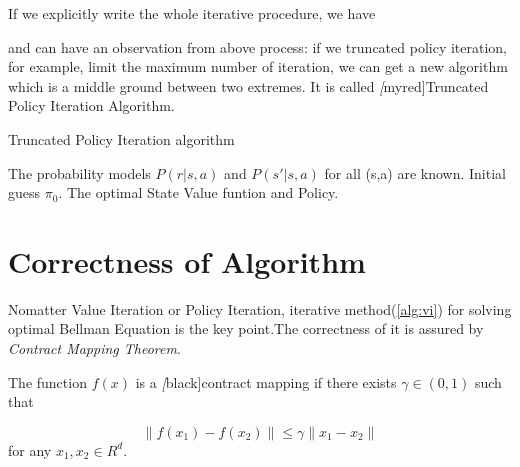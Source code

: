 If we explicitly write the whole iterative procedure, we have \par
\begin{minipage}{\textwidth}
	\centering
\end{minipage}
and can have an observation from above process:
if we truncated policy iteration, for example, limit the maximum number of iteration, we can get a new algorithm which is a middle ground between two extremes. It is called \emph[myred]{Truncated Policy Iteration Algorithm}.\par
\begin{algorithm}[H]
	\caption{Truncated Policy Iteration algorithm}
	\KwIn The probability models $P(r|s,a)$ and $P(s'|s,a)$ for all (s,a) are known. Initial guess $\pi_0$.
	\KwOut The optimal State Value funtion and Policy.\\
\end{algorithm}

\section{Correctness of Algorithm}
Nomatter Value Iteration or Policy Iteration, iterative method(\ref{alg:vi}) for solving optimal Bellman Equation is the key point.The
correctness of it is assured by \emph{Contract Mapping Theorem}. \par
\begin{definition}
	The function $f(x)$ is a \emph[black]{contract mapping} if there exists $\gamma \in (0,1)$ such that

	\begin{equation}
		\|f(x_1)-f(x_2)\| \le \gamma \|x_1-x_2\|
	\end{equation}
	for any $x_1,x_2 \in R^d$.
\end{definition}

